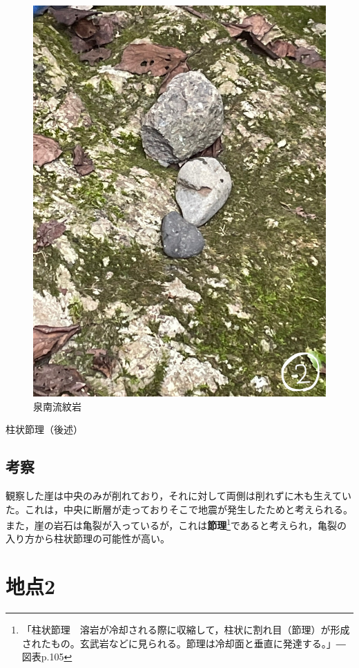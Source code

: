\documentclass[uplatex,b5paper]{jsreport}
\begin{document}
\begin{figure}[h]
\begin{center}
      \includegraphics[scale=0.12]{files/地学実習/泉南流紋岩_2.jpg}
      \caption{泉南流紋岩}
    \end{center}
  \end{figure}

    柱状節理（後述）
    \subsection{考察}
    観察した崖は中央のみが削れており，それに対して両側は削れずに木も生えていた。これは，中央に断層が走っておりそこで地震が発生したためと考えられる。また，崖の岩石は亀裂が入っているが，これは\textbf{節理}\footnote{「柱状節理　溶岩が冷却される際に収縮して，柱状に割れ目（節理）が形成されたもの。玄武岩などに見られる。節理は冷却面と垂直に発達する。」―図表p.105}であると考えられ，亀裂の入り方から柱状節理の可能性が高い。
  \clearpage

  \section{地点2}
\end{document}
